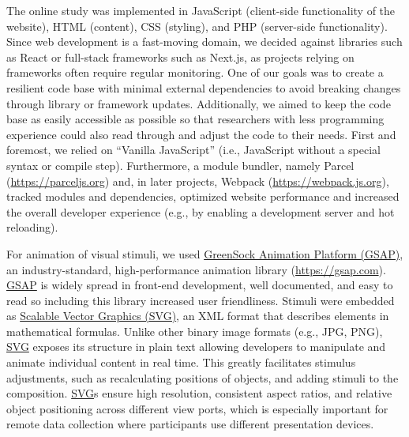 \documentclass[
]{scrbook}
\begin{document}
The online study was implemented in JavaScript (client-side functionality of the website), HTML (content), CSS (styling), and PHP (server-side functionality). Since web development is a fast-moving domain, we decided against libraries such as React or full-stack frameworks such as Next.js, as projects relying on frameworks often require regular monitoring. One of our goals was to create a resilient code base with minimal external dependencies to avoid breaking changes through library or framework updates. Additionally, we aimed to keep the code base as easily accessible as possible so that researchers with less programming experience could also read through and adjust the code to their needs. First and foremost, we relied on ``Vanilla JavaScript'' (i.e., JavaScript without a special syntax or compile step). Furthermore, a module bundler, namely Parcel (\mbox{\url{https://parceljs.org}}) and, in later projects, Webpack (\mbox{\url{https://webpack.js.org}}), tracked modules and dependencies, optimized website performance and increased the overall developer experience (e.g., by enabling a development server and hot reloading).

For animation of visual stimuli, we used \hyperref[acronyms_GSAP]{GreenSock Animation Platform (GSAP)}, an industry-standard, high-performance animation library (\mbox{\url{https://gsap.com}}). \hyperref[acronyms_GSAP]{GSAP} is widely spread in front-end development, well documented, and easy to read so including this library increased user friendliness. Stimuli were embedded as \hyperref[acronyms_SVG]{Scalable Vector Graphics (SVG)}, an XML format that describes elements in mathematical formulas. Unlike other binary image formats (e.g., JPG, PNG), \hyperref[acronyms_SVG]{SVG} exposes its structure in plain text allowing developers to manipulate and animate individual content in real time. This greatly facilitates stimulus adjustments, such as recalculating positions of objects, and adding stimuli to the composition. \hyperref[acronyms_SVG]{SVG}s ensure high resolution, consistent aspect ratios, and relative object positioning across different view ports, which is especially important for remote data collection where participants use different presentation devices.
\end{document}
